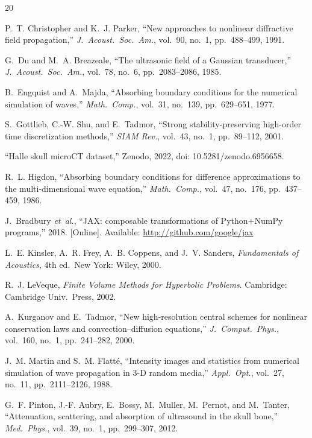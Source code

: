 \documentclass[11pt]{article}
\begin{document}
\begin{thebibliography}{20}

P.~T. Christopher and K.~J. Parker,
``New approaches to nonlinear diffractive field propagation,''
\textit{J.\ Acoust.\ Soc.\ Am.}, vol.~90, no.~1, pp.~488--499, 1991.

G.~Du and M.~A. Breazeale,
``The ultrasonic field of a Gaussian transducer,''
\textit{J.\ Acoust.\ Soc.\ Am.}, vol.~78, no.~6, pp.~2083--2086, 1985.

B.~Engquist and A.~Majda,
``Absorbing boundary conditions for the numerical simulation of waves,''
\textit{Math.\ Comp.}, vol.~31, no.~139, pp.~629--651, 1977.

S.~Gottlieb, C.-W. Shu, and E.~Tadmor,
``Strong stability-preserving high-order time discretization methods,''
\textit{SIAM Rev.}, vol.~43, no.~1, pp.~89--112, 2001.

``Halle skull microCT dataset,'' Zenodo, 2022,
doi: 10.5281/zenodo.6956658.

R.~L. Higdon,
``Absorbing boundary conditions for difference approximations to the
multi-dimensional wave equation,''
\textit{Math.\ Comp.}, vol.~47, no.~176, pp.~437--459, 1986.

J.~Bradbury \textit{et~al.},
``JAX: composable transformations of Python+NumPy programs,''
2018. [Online]. Available: \url{http://github.com/google/jax}

L.~E. Kinsler, A.~R. Frey, A.~B. Coppens, and J.~V. Sanders,
\textit{Fundamentals of Acoustics}, 4th ed.\ New York: Wiley, 2000.

R.~J. LeVeque,
\textit{Finite Volume Methods for Hyperbolic Problems}.
Cambridge: Cambridge Univ.\ Press, 2002.

A.~Kurganov and E.~Tadmor,
``New high-resolution central schemes for nonlinear conservation laws
and convection--diffusion equations,''
\textit{J.\ Comput.\ Phys.}, vol.~160, no.~1, pp.~241--282, 2000.

J.~M. Martin and S.~M. Flatt\'{e},
``Intensity images and statistics from numerical simulation of wave
propagation in 3-D random media,''
\textit{Appl.\ Opt.}, vol.~27, no.~11, pp.~2111--2126, 1988.

G.~F. Pinton, J.-F. Aubry, E.~Bossy, M.~Muller, M.~Pernot, and M.~Tanter,
``Attenuation, scattering, and absorption of ultrasound in the skull bone,''
\textit{Med.\ Phys.}, vol.~39, no.~1, pp.~299--307, 2012.


\end{thebibliography}
\end{document}
